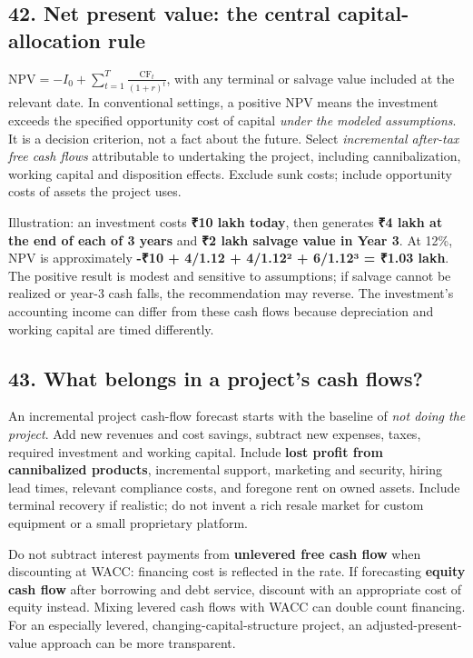 \subsection{42. Net present value: the central capital-allocation rule}


$\mathrm{NPV} = -I_0 + \sum_{t=1}^{T} \frac{\mathrm{CF}_t}{(1+r)^t}$, with any terminal or salvage value included at the relevant date. In conventional settings, a positive NPV means the investment exceeds the specified opportunity cost of capital \textit{under the modeled assumptions}. It is a decision criterion, not a fact about the future. Select \textit{incremental after-tax free cash flows} attributable to undertaking the project, including cannibalization, working capital and disposition effects. Exclude sunk costs; include opportunity costs of assets the project uses.

Illustration: an investment costs \textbf{₹10 lakh today}, then generates \textbf{₹4 lakh at the end of each of 3 years} and \textbf{₹2 lakh salvage value in Year 3}. At 12\%, NPV is approximately \textbf{-₹10 + 4/1.12 + 4/1.12² + 6/1.12³ = ₹1.03 lakh}. The positive result is modest and sensitive to assumptions; if salvage cannot be realized or year-3 cash falls, the recommendation may reverse. The investment's accounting income can differ from these cash flows because depreciation and working capital are timed differently.

\subsection{43. What belongs in a project's cash flows?}


An incremental project cash-flow forecast starts with the baseline of \textit{not doing the project}. Add new revenues and cost savings, subtract new expenses, taxes, required investment and working capital. Include \textbf{lost profit from cannibalized products}, incremental support, marketing and security, hiring lead times, relevant compliance costs, and foregone rent on owned assets. Include terminal recovery if realistic; do not invent a rich resale market for custom equipment or a small proprietary platform.

Do not subtract interest payments from \textbf{unlevered free cash flow} when discounting at WACC: financing cost is reflected in the rate. If forecasting \textbf{equity cash flow} after borrowing and debt service, discount with an appropriate cost of equity instead. Mixing levered cash flows with WACC can double count financing. For an especially levered, changing-capital-structure project, an adjusted-present-value approach can be more transparent.

